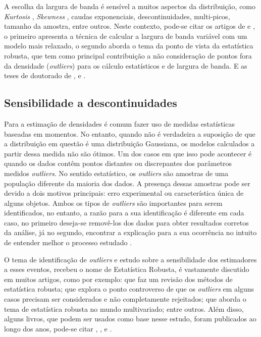 A escolha da largura de banda é sensível a muitos aspectos da distribuição, como \textit{Kurtosis} \cite{decarlo1997meaning}, \textit{Skewness} \cite{mardia1970measures}, caudas exponenciais, descontinuidades, multi-picos, tamanho da amostra, entre outros. Neste contexto, pode-se citar os artigos de \cite{oyang2005data} e \cite{kim2012robust}, o primeiro apresenta a técnica de calcular a largura de banda variável com um modelo mais relaxado, o segundo aborda o tema da ponto de vista da estatística robusta, que tem como principal contribuição a não consideração de pontos fora da densidade (\textit{outliers}) para os cálculo estatísticos e de largura de banda. E as teses de doutorado de \cite{walter1998density}, \cite{duong2004bandwidth} e \cite{schindler2012bandwidth}.

\subsection{Sensibilidade a descontinuidades}


Para a estimação de densidades é comum fazer uso de medidas estatísticas baseadas em momentos. No entanto, quando não é verdadeira a suposição de que a distribuição em questão é uma distribuição Gaussiana, os modelos calculados a partir dessa medida não são ótimos. Um dos casos em que isso pode acontecer é quando os dados contêm pontos distantes ou discrepantes dos parâmetros medidos \textit{outliers}. No sentido estatístico, os \textit{outliers} são amostras de uma população diferente da maioria dos dados. A presença dessas amostras pode ser devido a dois motivos principais: erro experimental ou característica única de alguns objetos. Ambos os tipos de \textit{outliers} são importantes para serem identificados, no entanto, a razão para a sua identificação é diferente em cada caso, no primeiro deseja-se removê-los dos dados para obter resultados corretos da análise, já no segundo, encontrar a explicação para a sua ocorrência no intuito de entender melhor o processo estudado \cite{daszykowski2007robust}.

O tema de identificação de \textit{outliers} e estudo sobre a sensibilidade dos estimadores a esses eventos, recebeu o nome de Estatística Robusta, é vastamente discutido em muitos artigos, como por exemplo: \cite{huber19721972} que faz um revisão dos métodos de estatística robusta; \cite{analytical1989robust} que explora o ponto controverso de que os \textit{outliers} em alguns casos precisam ser considerados e não completamente rejeitados; \cite{rousseeuw2018computation} que aborda o tema de estatística robusta no mundo multivariado; entre outros. Além disso, alguns livros, que podem ser usados como base nesse estudo, foram publicados ao longo dos anos, pode-se citar \cite{rousseeuw2005robust}, \cite{maronna2006robust}, \cite{hampel2011robust} e \cite{olive2018robust}.

